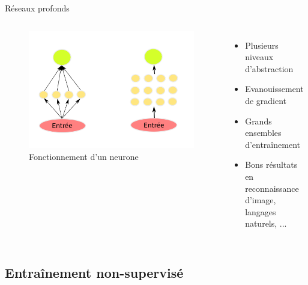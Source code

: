 \documentclass{beamer}
\begin{document}
\begin{frame}{Réseaux profonds}

  \begin{columns}
    \begin{figure}
      \centering
      \includegraphics[scale=0.1750]{../Figures/Deep}
      \caption{Fonctionnement d'un neurone}
    \end{figure}

    \begin{itemize}
    \item Plusieurs niveaux d'abstraction \pause
    \item Evanouissement de gradient \pause
    \item Grands ensembles d'entraînement \pause
    \item Bons résultats en reconnaissance d'image, langages naturels, ...
    \end{itemize}
  \end{columns}

\end{frame}

\subsection{Entraînement non-supervisé}
\end{document}
